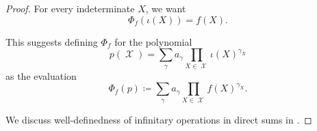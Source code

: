 \begin{proof}
  For every indeterminate \( X \), we want
  \begin{equation*}
    \Phi_f(\iota(X)) = f(X).
  \end{equation*}

  This suggests defining \( \Phi_f \) for the polynomial
  \begin{equation*}
    p(\mscrX) = \sum_\gamma a_\gamma \prod_{X \in \mscrX} \iota(X)^{\gamma_X}
  \end{equation*}
  as the evaluation
  \begin{equation*}
    \Phi_f(p) \coloneqq \sum_\gamma a_\gamma \prod_{X \in \mscrX} f(X)^{\gamma_X}.
  \end{equation*}

  We discuss well-definedness of infinitary operations in direct sums in .
\end{proof}

